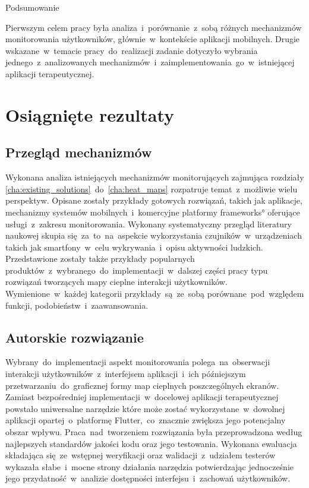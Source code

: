  \begin{chapter}{Podsumowanie}
	\newcommand{\chapterPath}{chapters/Summary}

	Pierwszym celem pracy była analiza~i~porównanie~z~sobą różnych mechanizmów monitorowania użytkowników, głównie~w~kontekście aplikacji mobilnych. Drugie wskazane~w~temacie pracy~do~realizacji zadanie dotyczyło wybrania jednego~z~analizowanych mechanizmów~i~zaimplementowania~go~w~istniejącej aplikacji terapeutycznej. 
	
	\section{Osiągnięte rezultaty}
	
	\subsection{Przegląd mechanizmów}
	Wykonana analiza istniejących mechanizmów monitorujących zajmująca rozdziały \ref{cha:existing_solutions}~do~\ref{cha:heat_maps} rozpatruje temat~z~możliwie wielu perspektyw. Opisane zostały przykłady gotowych rozwiązań, takich jak aplikacje, mechanizmy systemów mobilnych~i~komercyjne platformy \ang{frameworks} oferujące usługi~z~zakresu monitorowania. Wykonany systematyczny przegląd literatury naukowej skupia się~za~to~na~aspekcie wykorzystania czujników~w~urządzeniach takich jak smartfony~w~celu wykrywania~i~opisu aktywności ludzkich. Przedstawione zostały także przykłady popularnych produktów~z~wybranego~do~implementacji~w~dalszej części pracy typu rozwiązań tworzących mapy cieplne interakcji użytkowników. Wymienione~w~każdej kategorii przykłady~są~ze~sobą porównane~pod~względem funkcji, podobieństw~i~zaawansowania.
	
	\subsection{Autorskie rozwiązanie}
	Wybrany~do~implementacji aspekt monitorowania polega~na~obserwacji interakcji użytkowników~z~interfejsem aplikacji~i~ich późniejszym przetwarzaniu~do~graficznej formy map cieplnych poszczególnych ekranów. Zamiast bezpośredniej implementacji~w~docelowej aplikacji terapeutycznej powstało uniwersalne narzędzie które może zostać wykorzystane~w~dowolnej aplikacji opartej~o~platformę Flutter,~co~znacznie zwiększa jego potencjalny obszar wpływu. Praca~nad~tworzeniem rozwiązania była przeprowadzona według najlepszych standardów jakości kodu oraz jego testowania. Wykonana ewaluacja składająca się~ze~wstępnej weryfikacji oraz walidacji~z~udziałem testerów wykazała słabe~i~mocne strony działania narzędzia potwierdzając jednocześnie jego przydatność~w~analizie dostępności interfejsu~i~zachowań użytkowników.
	

\end{chapter}
